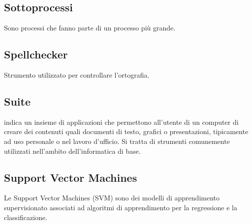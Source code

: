 \subsection*{Sottoprocessi}
Sono processi che fanno parte di un processo più grande.

\subsection*{Spellchecker}
Strumento utilizzato per controllare l'ortografia.

\subsection*{Suite}
indica un insieme di applicazioni che permettono all'utente di un computer di creare dei contenuti quali documenti di testo, grafici o presentazioni, tipicamente ad uso personale o nel lavoro d'ufficio.
Si tratta di strumenti comunemente utilizzati nell'ambito dell'informatica di base.

\subsection*{Support Vector Machines}
Le Support Vector Machines (SVM) sono dei modelli di apprendimento supervisionato associati ad algoritmi di apprendimento per la regressione e la classificazione.

